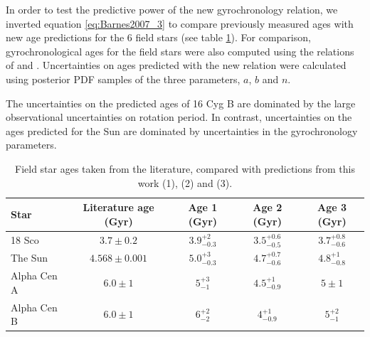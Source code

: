 \documentclass[useAMS, usenatbib]{mn2e}
\begin{document}
In order to test the predictive power of the new gyrochronology relation, we
inverted equation \ref{eq:Barnes2007_3} to compare previously measured ages
with new age predictions for the 6 field stars (see table
\ref{tab:comparison}).
For comparison, gyrochronological ages for the field stars were also computed
using the relations of \citet{Barnes2007} and \citet{Mamajek2008}.
Uncertainties on ages predicted with the new relation were calculated using
posterior PDF samples of the three parameters, $a$, $b$ and $n$.

The uncertainties on the predicted ages of 16 Cyg B are dominated by the large
observational uncertainties on rotation period.
In contrast, uncertainties on the ages predicted for the Sun are dominated by
uncertainties in the gyrochronology parameters.

\begin{table}
\caption{Field star ages taken from the literature, compared with
	predictions from this work (1), \citet{Mamajek2008} (2)
	and \citet{Barnes2007} (3). \label{tab:comparison}}

\begin{tabular}{lcccc}
\hline\hline
{Star} & {Literature age (Gyr)} & {Age 1 (Gyr)} & {Age 2 (Gyr)} & {Age 3 (Gyr)} \\
\hline

18 Sco      & $3.7 \pm 0.2$     & $3.9^{+2}_{-0.3}$ & $3.5^{+0.6}_{-0.5}$
	    & $3.7^{+0.8}_{-0.6}$ \\

The Sun     & $4.568 \pm 0.001$ & $5.0^{+3}_{-0.3}$ & $4.7^{+0.7}_{-0.6}$
	    & $4.8^{+1}_{-0.8}$ \\

Alpha Cen A & $6.0 \pm 1$       & $5^{+3}_{-1}$   & $4.5^{+1}_{-0.9}$
	    & $5\pm1$ \\

Alpha Cen B & $6.0 \pm 1$       & $6^{+2}_{-2}$       & $4^{+1}_{-0.9}$
	    & $5^{+2}_{-1}$ \\


\end{tabular}
\end{table}
\end{document}
